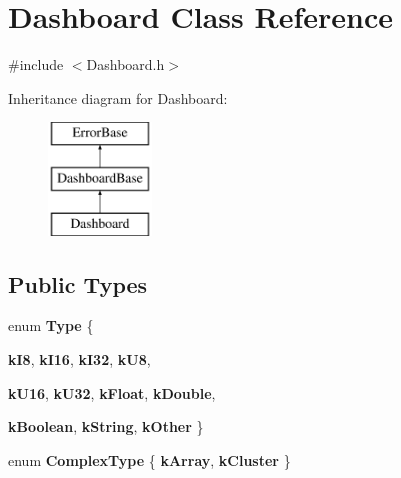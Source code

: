 \hypertarget{classDashboard}{
\section{Dashboard Class Reference}
\label{classDashboard}
}


{\ttfamily \#include $<$Dashboard.h$>$}

Inheritance diagram for Dashboard:\begin{figure}[H]
\begin{center}
\leavevmode
\includegraphics[height=3.000000cm]{classDashboard}
\end{center}
\end{figure}
\subsection*{Public Types}
\begin{DoxyCompactItemize}
\item 
enum {\bfseries Type} \{ \par
{\bfseries kI8}, 
{\bfseries kI16}, 
{\bfseries kI32}, 
{\bfseries kU8}, 
\par
{\bfseries kU16}, 
{\bfseries kU32}, 
{\bfseries kFloat}, 
{\bfseries kDouble}, 
\par
{\bfseries kBoolean}, 
{\bfseries kString}, 
{\bfseries kOther}
 \}
\item 
enum {\bfseries ComplexType} \{ {\bfseries kArray}, 
{\bfseries kCluster}
 \}
\end{DoxyCompactItemize}
